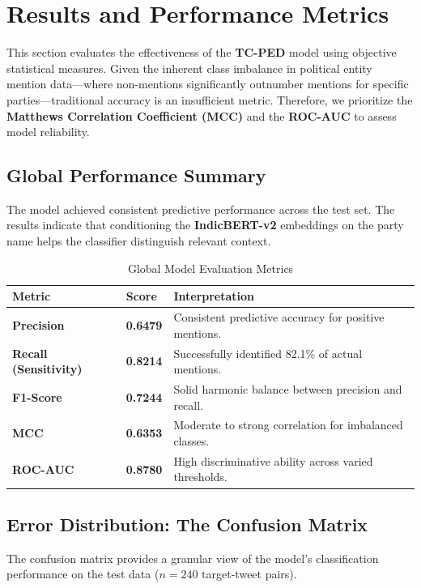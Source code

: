 \documentclass[12pt,a4paper]{article}
\begin{document}
\section{Results and Performance Metrics}
This section evaluates the effectiveness of the \textbf{TC-PED} model using objective statistical measures. Given the inherent class imbalance in political entity mention data—where non-mentions significantly outnumber mentions for specific parties—traditional accuracy is an insufficient metric. Therefore, we prioritize the \textbf{Matthews Correlation Coefficient (MCC)} and the \textbf{ROC-AUC} to assess model reliability.

\subsection{Global Performance Summary}
The model achieved consistent predictive performance across the test set. The results indicate that conditioning the \textbf{IndicBERT-v2} embeddings on the party name helps the classifier distinguish relevant context.

\begin{table}[H]
\centering
\begin{tabular}{@{}lll@{}}
\toprule
\textbf{Metric} & \textbf{Score} & \textbf{Interpretation} \\ \midrule
\textbf{Precision} & \textbf{0.6479} & Consistent predictive accuracy for positive mentions. \\
\textbf{Recall (Sensitivity)} & \textbf{0.8214} & Successfully identified 82.1\% of actual mentions. \\
\textbf{F1-Score} & \textbf{0.7244} & Solid harmonic balance between precision and recall. \\
\textbf{MCC} & \textbf{0.6353} & Moderate to strong correlation for imbalanced classes. \\
\textbf{ROC-AUC} & \textbf{0.8780} & High discriminative ability across varied thresholds. \\ \bottomrule
\end{tabular}
\caption{Global Model Evaluation Metrics}
\end{table}

\subsection{Error Distribution: The Confusion Matrix}
The confusion matrix provides a granular view of the model's classification performance on the test data ($n=240$ target-tweet pairs).
\end{document}
